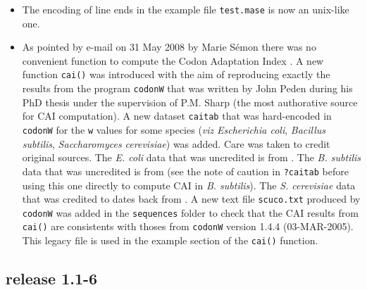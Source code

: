 \documentclass{article}
\begin{document}
\begin{itemize}
\item The encoding of line ends in the example file \texttt{test.mase}
  is now an unix-like one.

\item As pointed by e-mail on 31 May 2008 by Marie S{\'e}mon there was
  no convenient function to compute the Codon Adaptation Index \cite{CAI}.
  A new function \texttt{cai()} was introduced with the aim of reproducing
  exactly the results from the program \texttt{codonW} that was written
  by John Peden during his PhD thesis \cite{codonW} under the supervision 
  of P.M. Sharp (the most authorative source for CAI computation). A new 
  dataset \texttt{caitab} that was hard-encoded in \texttt{codonW} for
  the \texttt{w} values for some species (\textit{viz}
  \textit{Escherichia coli}, \textit{Bacillus subtilis},
  \textit{Saccharomyces cerevisiae}) was added. Care was taken to credit
  original sources. The \textit{E. coli} data that was uncredited is
  from \cite{CAI}. The \textit{B. subtilis} data that was uncredited
  is from \cite{ShieldsDC1987} (see the note of caution in \texttt{?caitab}
  before using this one directly to compute CAI in \textit{B. subtilis}). 
  The \textit{S. cerevisiae} data that was
  credited to \cite{SharpPM1991} dates back from \cite{CAI}. A new
  text file \texttt{scuco.txt} produced by \texttt{codonW} was added
  in the \texttt{sequences} folder to check that the CAI results from
  \texttt{cai()} are consistents with thoses from \texttt{codonW} version
  1.4.4 (03-MAR-2005). This legacy file is used in the example section of
  the \texttt{cai()} function.

\end{itemize}

\subsection*{release 1.1-6}
\end{document}
